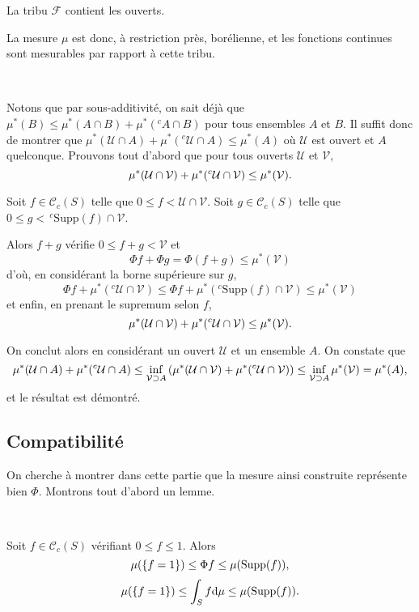 \documentclass{article}
\begin{document}
\begin{Thm} La tribu $\mathcal F$ contient les ouverts. \end{Thm}

La mesure $\mu$ est donc, à restriction près, borélienne, et les fonctions continues sont mesurables par rapport à cette tribu.

\begin{Dem}~

Notons que par sous-additivité, on sait déjà que $\mu^*(B)\leq\mu^*(A\cap B)+\mu^*(^cA\cap B)$ pour tous ensembles $A$ et $B$. Il suffit donc de montrer que $\mu^*(\mathcal U\cap A)+\mu^*(^c\mathcal U\cap A)\leq\mu^*(A)$ où $\mathcal U$ est ouvert et $A$ quelconque. Prouvons tout d'abord que pour tous ouverts $\mathcal U$ et $\mathcal V$,
$$\mu^*(\mathcal U\cap\mathcal V)+\mu^*(^c\mathcal U\cap\mathcal V)\leq\mu^*(\mathcal V)\text.$$

Soit $f\in\mathcal C_c(S)$ telle que $0\leq f<\mathcal U\cap\mathcal V$. Soit $g\in\mathcal C_c(S)$ telle que $0\leq g<\,^c\mathrm{Supp}(f)\cap\mathcal V$.

Alors $f+g$ vérifie $0\leq f+g<\mathcal V$ et
$$\Phi f+\Phi g=\Phi(f+g)\leq\mu^*(\mathcal V)$$
d'où, en considérant la borne supérieure sur $g$,
$$\Phi f+\mu^*(^c\mathcal U\cap\mathcal V) \leq \Phi f+\mu^*(^c\mathrm{Supp}(f)\cap\mathcal V)
                                           \leq \mu^*(\mathcal V)$$
et enfin, en prenant le supremum selon $f$,
$$\mu^*(\mathcal U\cap\mathcal V)+\mu^*(^c\mathcal U\cap\mathcal V)\leq\mu^*(\mathcal V)\text.$$

On conclut alors en considérant un ouvert $\mathcal U$ et un ensemble $A$. On constate que
$$\mu^*(\mathcal U\cap A)+\mu^*(^c\mathcal U\cap A)
    \leq \inf_{\mathcal V\supset A}\left( \mu^*(\mathcal U\cap \mathcal V)
                                        + \mu^*(^c\mathcal U\cap\mathcal V)
                                          \right)
    \leq \inf_{\mathcal V\supset A} \mu^*(\mathcal V)
       = \mu^*(A)\text,$$
et le résultat est démontré.
\end{Dem}

\subsection{Compatibilité}

On cherche à montrer dans cette partie que la mesure ainsi construite représente bien $\Phi$. Montrons tout d'abord un lemme.

\begin{Lem}~
\label{Inegalites}

Soit $f\in\mathcal C_c(S)$ vérifiant $0\leq f\leq1$. Alors
$$\mu(\left\{f=1\right\})\leq\Phi f\leq\mu(\mathrm{Supp}(f))\text,$$
$$\mu(\left\{f=1\right\})\leq\int_Sf\mathrm{d}\mu\leq\mu(\mathrm{Supp}(f))\text.$$
\end{Lem}
\end{document}

